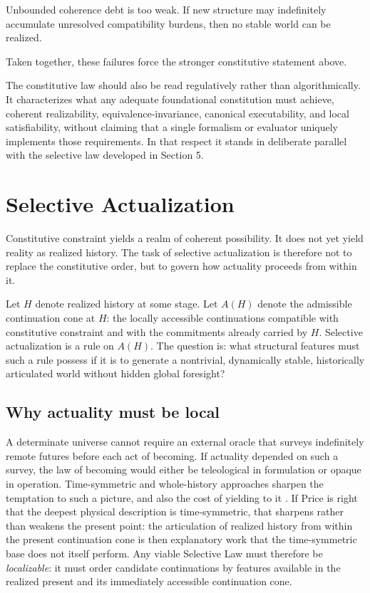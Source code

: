 \documentclass[11pt]{article}
\theoremstyle{foundation}
\begin{document}
Unbounded coherence debt is too weak. If new structure may indefinitely accumulate unresolved compatibility burdens, then no stable world can be realized.

Taken together, these failures force the stronger constitutive statement above.

The constitutive law should also be read regulatively rather than algorithmically. It characterizes what any adequate foundational constitution must achieve, coherent realizability, equivalence-invariance, canonical executability, and local satisfiability, without claiming that a single formalism or evaluator uniquely implements those requirements. In that respect it stands in deliberate parallel with the selective law developed in Section 5.

\section{Selective Actualization}

Constitutive constraint yields a realm of coherent possibility. It does not yet yield reality as realized history. The task of selective actualization is therefore not to replace the constitutive order, but to govern how actuality proceeds from within it.

Let $H$ denote realized history at some stage. Let $A(H)$ denote the admissible continuation cone at $H$: the locally accessible continuations compatible with constitutive constraint and with the commitments already carried by $H$. Selective actualization is a rule on $A(H)$. The question is: what structural features must such a rule possess if it is to generate a nontrivial, dynamically stable, historically articulated world without hidden global foresight?

\subsection{Why actuality must be local}

A determinate universe cannot require an external oracle that surveys indefinitely remote futures before each act of becoming. If actuality depended on such a survey, the law of becoming would either be teleological in formulation or opaque in operation. Time-symmetric and whole-history approaches sharpen the temptation to such a picture, and also the cost of yielding to it \citep{Price1996,WheelerFeynman1945,WheelerFeynman1949}. If Price is right that the deepest physical description is time-symmetric, that sharpens rather than weakens the present point: the articulation of realized history from within the present continuation cone is then explanatory work that the time-symmetric base does not itself perform. Any viable Selective Law must therefore be \emph{localizable}: it must order candidate continuations by features available in the realized present and its immediately accessible continuation cone.
\end{document}
